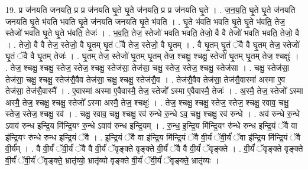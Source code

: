 \documentclass[17pt]{extarticle}
\begin{document}
19. प्र ज॑नयति जनयति॒ प्र प्र ज॑नयति घृ॒ते घृ॒ते ज॑नयति॒ प्र प्र ज॑नयति घृ॒ते । . ज॒न॒य॒ति॒ घृ॒ते घृ॒ते ज॑नयति जनयति घृ॒ते भ॑वति भवति घृ॒ते ज॑नयति जनयति घृ॒ते भ॑वति । . घृ॒ते भ॑वति भवति घृ॒ते घृ॒ते भ॑वति॒ तेज॒ स्तेजो॑ भवति घृ॒ते घृ॒ते भ॑वति॒ तेजः॑ । . भ॒व॒ति॒ तेज॒ स्तेजो॑ भवति भवति॒ तेजो॒ वै वै तेजो॑ भवति भवति॒ तेजो॒ वै । . तेजो॒ वै वै तेज॒ स्तेजो॒ वै घृ॒तम् घृ॒तं ॅवै तेज॒ स्तेजो॒ वै घृ॒तम् । . वै घृ॒तम् घृ॒तं ॅवै वै घृ॒तम् तेज॒ स्तेजो॑ घृ॒तं ॅवै वै घृ॒तम् तेजः॑ । . घृ॒तम् तेज॒ स्तेजो॑ घृ॒तम् घृ॒तम् तेज॒ श्चक्षु॒ श्चक्षु॒ स्तेजो॑ घृ॒तम् घृ॒तम् तेज॒ श्चक्षुः॑ । . तेज॒ श्चक्षु॒ श्चक्षु॒ स्तेज॒ स्तेज॒ श्चक्षु॒ स्तेज॑सा॒ तेज॑सा॒ चक्षु॒ स्तेज॒ स्तेज॒ श्चक्षु॒ स्तेज॑सा । . चक्षु॒ स्तेज॑सा॒ तेज॑सा॒ चक्षु॒ श्चक्षु॒ स्तेज॑सै॒वैव तेज॑सा॒ चक्षु॒ श्चक्षु॒ स्तेज॑सै॒व । . तेज॑सै॒वैव तेज॑सा॒ तेज॑सै॒वास्मा॑ अस्मा ए॒व तेज॑सा॒ तेज॑सै॒वास्मै᳚ । . ए॒वास्मा॑ अस्मा ए॒वैवास्मै॒ तेज॒ स्तेजो᳚ ऽस्मा ए॒वैवास्मै॒ तेजः॑ । . अ॒स्मै॒ तेज॒ स्तेजो᳚ ऽस्मा अस्मै॒ तेज॒ श्चक्षु॒ श्चक्षु॒ स्तेजो᳚ ऽस्मा अस्मै॒ तेज॒ श्चक्षुः॑ । . तेज॒ श्चक्षु॒ श्चक्षु॒ स्तेज॒ स्तेज॒ श्चक्षु॒ रवाव॒ चक्षु॒ स्तेज॒ स्तेज॒ श्चक्षु॒ रव॑ । . चक्षु॒ रवाव॒ चक्षु॒ श्चक्षु॒ रव॑ रुन्धे रु॒न्धे ऽव॒ चक्षु॒ श्चक्षु॒ रव॑ रुन्धे । . अव॑ रुन्धे रु॒न्धे ऽवाव॑ रुन्ध इन्द्रि॒य मि॑न्द्रि॒यꣳ रु॒न्धे ऽवाव॑ रुन्ध इन्द्रि॒यम् । . रु॒न्ध॒ इ॒न्द्रि॒य मि॑न्द्रि॒यꣳ रु॑न्धे रुन्ध इन्द्रि॒यं ॅवै वा इ॑न्द्रि॒यꣳ रु॑न्धे रुन्ध इन्द्रि॒यं ॅवै । . इ॒न्द्रि॒यं ॅवै वा इ॑न्द्रि॒य मि॑न्द्रि॒यं ॅवै वी॒र्यं॑ ॅवी॒र्यं॑ ॅवा इ॑न्द्रि॒य मि॑न्द्रि॒यं ॅवै वी॒र्य᳚म् । . वै वी॒र्यं॑ ॅवी॒र्यं॑ ॅवै वै वी॒र्यं॑ ॅवृङ्क्ते वृङ्क्ते वी॒र्यं॑ ॅवै वै वी॒र्यं॑ ॅवृङ्क्ते । . वी॒र्यं॑ ॅवृङ्क्ते वृङ्क्ते वी॒र्यं॑ ॅवी॒र्यं॑ ॅवृङ्क्ते॒ भ्रातृ॑व्यो॒ भ्रातृ॑व्यो वृङ्क्ते वी॒र्यं॑ ॅवी॒र्यं॑ ॅवृङ्क्ते॒ भ्रातृ॑व्यः । \newline
\end{document}
